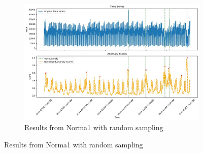 \documentclass[11pt]{article}
\begin{document}
\begin{figure}[h]
    \centering
    \begin{subfigure}[b]{0.5\textwidth}
        \includegraphics[width=\textwidth]{algo0.jpg}
        \caption{Results from Norma1 with random sampling}
        \label{fig:algo0}
    \end{subfigure}
    \hfill


\end{figure}
\end{document}
